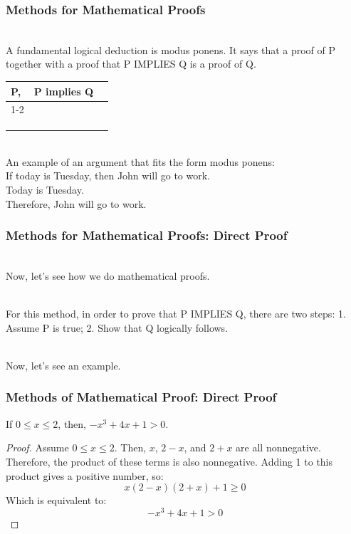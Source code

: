 \documentclass{beamer}
\numberwithin{equation}{section}
\begin{document}
\begin{frame}
\frametitle{Methods for Mathematical Proofs}

\ \\A fundamental logical deduction is modus ponens. It says that a proof of P together with a proof that P IMPLIES Q is a proof of Q. \pause

\begin{table}[]
\begin{tabular}{ccl}
\multicolumn{1}{l}{P,} & \multicolumn{1}{l}{P implies Q} &  \\ \cline{1-2}
\multicolumn{2}{c}{Q}                                    &  \\
                       &                                 &  \\
                       &                                 &  \\
                       &                                 & 
\end{tabular}
\end{table} \pause

\ \\An example of an argument that fits the form modus ponens: \pause
\ \\If today is Tuesday, then John will go to work.
\ \\Today is Tuesday.
\ \\Therefore, John will go to work.

\end{frame}



\begin{frame}
\frametitle{Methods for Mathematical Proofs: Direct Proof}

\ \\Now, let's see how we do mathematical proofs. \pause

\ \\For this method, in order to prove that P IMPLIES Q, there are two steps: 1. Assume P is true; 2. Show that Q logically follows. \pause

\ \\Now, let's see an example.

\end{frame}


\begin{frame}
\frametitle{Methods of Mathematical Proof: Direct Proof}

\begin{theorem}
If $0 \leq x \leq 2$, then, $- x^{3} + 4x + 1 > 0$.
\end{theorem} \pause

\begin{proof}
Assume $0 \leq x \leq 2$. \pause
Then, $x$, $2 - x$, and $2 + x$ are all nonnegative. \pause
Therefore, the product of these terms is also nonnegative. Adding 1 to this product gives a positive number, so:
$$x (2 - x) (2 + x) + 1 \geq 0$$ \pause
Which is equivalent to:
$$- x^{3} + 4x + 1 > 0$$
\end{proof}

\end{frame}
\end{document}
